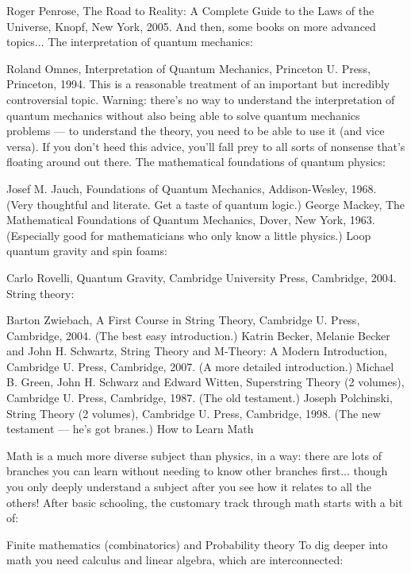 \documentclass[10pt,a4paper]{book}
\theoremstyle{definition}
\begin{document}
Roger Penrose, The Road to Reality: A Complete Guide to the Laws of the Universe, Knopf, New York, 2005.
And then, some books on more advanced topics...
The interpretation of quantum mechanics:

Roland Omnes, Interpretation of Quantum Mechanics, Princeton U. Press, Princeton, 1994.
This is a reasonable treatment of an important but incredibly controversial topic. Warning: there's no way to understand the interpretation of quantum mechanics without also being able to solve quantum mechanics problems — to understand the theory, you need to be able to use it (and vice versa). If you don't heed this advice, you'll fall prey to all sorts of nonsense that's floating around out there.
The mathematical foundations of quantum physics:

Josef M. Jauch, Foundations of Quantum Mechanics, Addison-Wesley, 1968. (Very thoughtful and literate. Get a taste of quantum logic.)
George Mackey, The Mathematical Foundations of Quantum Mechanics, Dover, New York, 1963. (Especially good for mathematicians who only know a little physics.)
Loop quantum gravity and spin foams:

Carlo Rovelli, Quantum Gravity, Cambridge University Press, Cambridge, 2004.
String theory:

Barton Zwiebach, A First Course in String Theory, Cambridge U. Press, Cambridge, 2004. (The best easy introduction.)
Katrin Becker, Melanie Becker and John H. Schwartz, String Theory and M-Theory: A Modern Introduction, Cambridge U. Press, Cambridge, 2007. (A more detailed introduction.)
Michael B. Green, John H. Schwarz and Edward Witten, Superstring Theory (2 volumes), Cambridge U. Press, Cambridge, 1987. (The old testament.)
Joseph Polchinski, String Theory (2 volumes), Cambridge U. Press, Cambridge, 1998. (The new testament — he's got branes.)
How to Learn Math

Math is a much more diverse subject than physics, in a way: there are lots of branches you can learn without needing to know other branches first... though you only deeply understand a subject after you see how it relates to all the others!
After basic schooling, the customary track through math starts with a bit of:

Finite mathematics (combinatorics)
and
Probability theory
To dig deeper into math you need calculus and linear algebra, which are interconnected:
\end{document}
